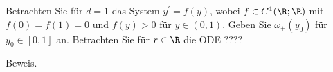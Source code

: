 \begin{exercise}
Betrachten Sie für $d = 1$ das System $y^{\prime} = f(y)$, wobei $f \in C^1(\R;\R)$
mit $f(0) = f(1) = 0$ und $f(y) > 0$ für $y \in (0,1)$. Geben Sie $\omega_+(y_0)$
für $y_0 \in [0,1]$ an. Betrachten Sie für $r \in \R$ die ODE ????
\end{exercise}
\begin{solution}
Beweis.
\end{solution}
